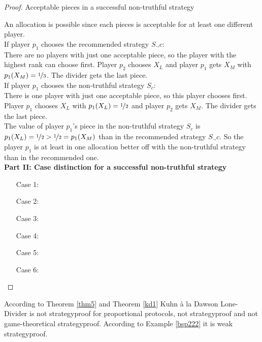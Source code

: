\begin{proof}
\begin{table}[htb]
\caption{Acceptable pieces in a successful non-truthful strategy}\label{Table11}
\end{table}
\newpage An allocation is possible since each pieces is acceptable for at least one different player.\\ \newline If player $p_1$ chooses the recommended strategy $S_\neg c$:\\
There are no players with just one acceptable piece, so the player with the highest rank can choose first.
Player $p_2$ chooses $X_L$ and player $p_1$ gets $X_M$ with $p_1(X_M)= \nicefrac{1}{3}$. The divider gets the last piece.\\
\newline
If player $p_1$ chooses the non-truthful strategy $S_c$:\\
There is one player with just one acceptable piece, so this player chooses first.
Player $p_1$ chooses $X_L$ with $p_1(X_L)= \nicefrac{1}{2}$ and player $p_2$ gets $X_M$. The divider gets the last piece.\\
The value of player $p_1$'s piece in the non-truthful strategy $S_c$ is $p_1(X_L)=\nicefrac{1}{2}>\nicefrac{1}{2}=p_1(X_M)$ than in the recommended strategy $S_\neg c$. So the player $p_1$ is at least in one allocation better off with the non-truthful strategy than in the recommended one.\\
\newline
\textbf{Part II: Case distinction for a successful non-truthful strategy} 
\begin{itemize}
\item[Case] 1: 
\item[Case] 2:
\item[Case] 3:
\item[Case] 4:
\item[Case] 5:
\item[Case] 6:
\end{itemize}
\end{proof}
\begin{bezeichnungen}
According to Theorem \ref{thm5} and Theorem \ref{kd1} Kuhn à la Dawson Lone-Divider is not strategyproof for proportional protocols, not strategyproof and not game-theoretical strategyproof. According to Example \ref{bsp222} it is weak strategyproof.
\end{bezeichnungen}
\newpage
